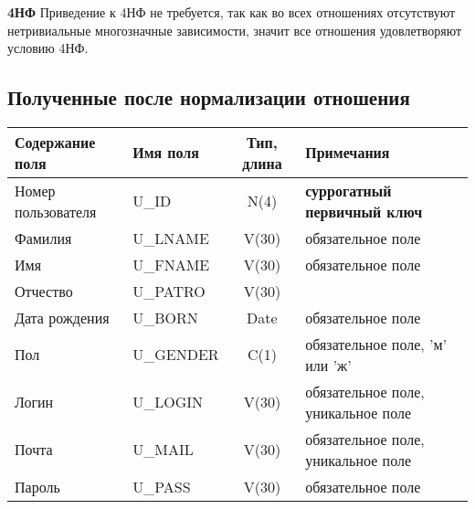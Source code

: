 \documentclass[a4paper,14pt]{article}
\begin{document}
\textbf{4НФ}
Приведение к 4НФ не требуется, так как во всех отношениях отсутствуют нетривиальные многозначные зависимости, значит все отношения удовлетворяют условию 4НФ.


\subsection{Полученные после нормализации отношения}




\begin{table}[H]
	\begin{flushleft} 
	\end{flushleft}
	\begin{adjustbox}{width=\linewidth}
		\begin{tabular}{|l|l|c|l|}
			\hline
			Содержание поля    & Имя поля  & Тип, длина & Примечания                          \\ \hline
			Номер пользователя & U\_ID     &    N(4)    & \textbf{суррогатный первичный ключ} \\ \hline
			Фамилия            & U\_LNAME  &   V(30)    & обязательное поле                   \\ \hline
			Имя                & U\_FNAME  &   V(30)    & обязательное поле                   \\ \hline
			Отчество           & U\_PATRO  &   V(30)    &                                     \\ \hline
			Дата рождения      & U\_BORN   &    Date    & обязательное поле                   \\ \hline
			Пол                & U\_GENDER &    C(1)    & обязательное поле, 'м' или 'ж'      \\ \hline
			Логин              & U\_LOGIN  &   V(30)    & обязательное поле, уникальное поле  \\ \hline
			Почта              & U\_MAIL   &   V(30)    & обязательное поле, уникальное поле  \\ \hline
			Пароль             & U\_PASS   &   V(30)    & обязательное поле                   \\ \hline
		\end{tabular}
	\end{adjustbox}
\end{table}

\end{document}
